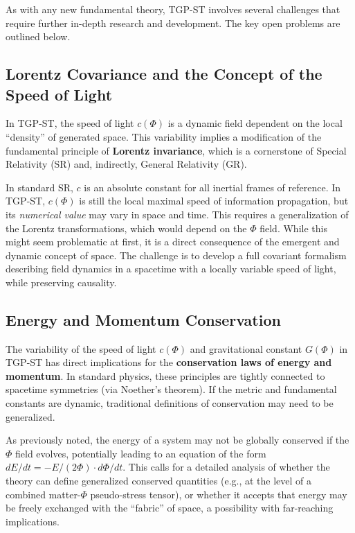 \documentclass[11pt,a4paper]{article}
\begin{document}
As with any new fundamental theory, TGP-ST involves several challenges that require further in-depth research and development. The key open problems are outlined below.

\subsection{Lorentz Covariance and the Concept of the Speed of Light}
In TGP-ST, the speed of light $c(\Phi)$ is a dynamic field dependent on the local “density” of generated space. This variability implies a modification of the fundamental principle of \textbf{Lorentz invariance}, which is a cornerstone of Special Relativity (SR) and, indirectly, General Relativity (GR). 

In standard SR, $c$ is an absolute constant for all inertial frames of reference. In TGP-ST, $c(\Phi)$ is still the local maximal speed of information propagation, but its \textit{numerical value} may vary in space and time. This requires a generalization of the Lorentz transformations, which would depend on the $\Phi$ field. While this might seem problematic at first, it is a direct consequence of the emergent and dynamic concept of space. The challenge is to develop a full covariant formalism describing field dynamics in a spacetime with a locally variable speed of light, while preserving causality.

\subsection{Energy and Momentum Conservation}
The variability of the speed of light $c(\Phi)$ and gravitational constant $G(\Phi)$ in TGP-ST has direct implications for the \textbf{conservation laws of energy and momentum}. In standard physics, these principles are tightly connected to spacetime symmetries (via Noether's theorem). If the metric and fundamental constants are dynamic, traditional definitions of conservation may need to be generalized.

As previously noted, the energy of a system may not be globally conserved if the $\Phi$ field evolves, potentially leading to an equation of the form $dE/dt = -E/(2\Phi) \cdot d\Phi/dt$. This calls for a detailed analysis of whether the theory can define generalized conserved quantities (e.g., at the level of a combined matter-$\Phi$ pseudo-stress tensor), or whether it accepts that energy may be freely exchanged with the “fabric” of space, a possibility with far-reaching implications.
\end{document}
